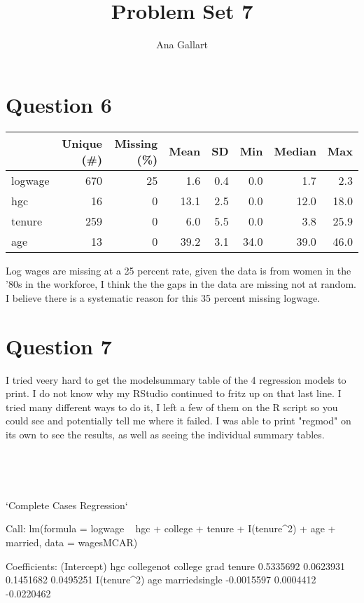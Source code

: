 \documentclass{article}
\title{Problem Set 7}
\author{Ana Gallart}
\begin{document}
\maketitle
 \section{Question 6}

\begin{table}[h]
\centering
\begin{tabular}[t]{lrrrrrrr}
\toprule
  & Unique (\#) & Missing (\%) & Mean & SD & Min & Median & Max\\
\midrule
logwage & 670 & 25 & \num{1.6} & \num{0.4} & \num{0.0} & \num{1.7} & \num{2.3}\\
hgc & 16 & 0 & \num{13.1} & \num{2.5} & \num{0.0} & \num{12.0} & \num{18.0}\\
tenure & 259 & 0 & \num{6.0} & \num{5.5} & \num{0.0} & \num{3.8} & \num{25.9}\\
age & 13 & 0 & \num{39.2} & \num{3.1} & \num{34.0} & \num{39.0} & \num{46.0}\\
\bottomrule
\end{tabular}
\end{table}

Log wages are missing at a 25 percent rate, given the data is from women in the '80s in the workforce, I think the the gaps in the data are missing not at random. I believe there is a systematic reason for this 35 percent missing logwage.

\section{Question 7}
I tried veery hard to get the modelsummary table of the 4 regression models to print. I do not know why my RStudio continued to fritz up on that last line. I tried many different ways to do it, I left a few of them on the R script so you could see and potentially tell me where it failed. I was able to print "regmod" on its own to see the results, as well as seeing the individual summary tables. 

\

\ 

`Complete Cases Regression`

Call:
lm(formula = logwage ~ hgc + college + tenure + I(tenure^2) + 
    age + married, data = wagesMCAR)

Coefficients:
            (Intercept)                      hgc  collegenot college grad                   tenure  
              0.5335692                0.0623931                0.1451682                0.0495251  
            I(tenure^2)                      age            marriedsingle  
             -0.0015597                0.0004412               -0.0220462  
\end{document}
